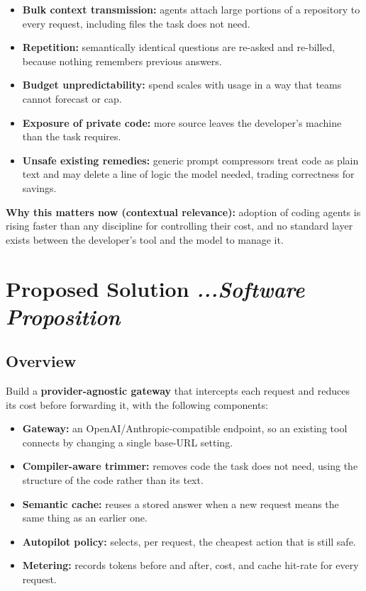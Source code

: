 \documentclass[11pt,a4paper]{article}
\newcommand{\BvrHint}[1]{%
  {\normalfont\normalsize\itshape\hfill #1}}
\begin{document}
\begin{itemize}[noitemsep]
  \item \textbf{Bulk context transmission:} agents attach large portions of a
        repository to every request, including files the task does not need.
  \item \textbf{Repetition:} semantically identical questions are re-asked and
        re-billed, because nothing remembers previous answers.
  \item \textbf{Budget unpredictability:} spend scales with usage in a way that
        teams cannot forecast or cap.
  \item \textbf{Exposure of private code:} more source leaves the developer's
        machine than the task requires.
  \item \textbf{Unsafe existing remedies:} generic prompt compressors treat code
        as plain text and may delete a line of logic the model needed, trading
        correctness for savings.
\end{itemize}

\textbf{Why this matters now (contextual relevance):} adoption of coding agents
is rising faster than any discipline for controlling their cost, and no standard
layer exists between the developer's tool and the model to manage it.

\section{Proposed Solution \BvrHint{...Software Proposition}}

\subsection{Overview}
Build a \textbf{provider-agnostic gateway} that intercepts each request and
reduces its cost before forwarding it, with the following components:

\begin{itemize}[noitemsep]
  \item \textbf{Gateway:} an OpenAI/Anthropic-compatible endpoint, so an
        existing tool connects by changing a single base-URL setting.
  \item \textbf{Compiler-aware trimmer:} removes code the task does not need,
        using the structure of the code rather than its text.
  \item \textbf{Semantic cache:} reuses a stored answer when a new request means
        the same thing as an earlier one.
  \item \textbf{Autopilot policy:} selects, per request, the cheapest action that
        is still safe.
  \item \textbf{Metering:} records tokens before and after, cost, and cache
        hit-rate for every request.
\end{itemize}
\end{document}
